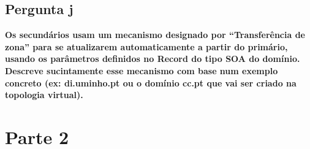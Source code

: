 \documentclass[a4paper]{report}
\begin{document}
\section{Pergunta j}
\textbf{Os secundários usam um mecanismo designado por “Transferência de zona”
para se atualizarem automaticamente a partir do primário, usando os parâmetros
definidos no Record do tipo SOA do domínio. Descreve sucintamente esse mecanismo
com base num exemplo concreto (ex: di.uminho.pt ou o domínio cc.pt que vai ser
criado na topologia virtual).}

\chapter{Parte 2}
\end{document}

